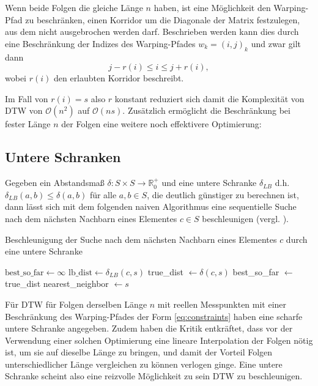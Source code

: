 Wenn beide Folgen die gleiche Länge $n$ haben, ist eine Möglichkeit den Warping-Pfad zu beschränken, einen Korridor um die Diagonale der Matrix festzulegen, aus dem nicht ausgebrochen werden darf. Beschrieben werden kann dies durch eine Beschränkung der Indizes des Warping-Pfades \( w_k = (i,j)_k \) und zwar gilt dann
\begin{equation}
  \label{eq:constraints}
  j - r(i) \leq i \leq j + r(i) ,
\end{equation}
wobei $r(i)$ den erlaubten Korridor beschreibt.

Im Fall von \(r(i) = s\) also $r$ konstant reduziert sich damit die Komplexität von DTW von \( \mathcal{O}(n^2) \) auf \( \mathcal{O}(ns) \). Zusätzlich ermöglicht die Beschränkung bei fester Länge $n$ der Folgen eine weitere noch effektivere Optimierung:

\subsection{Untere Schranken} %
\label{sub:lower_bounding}

Gegeben ein Abstandsmaß \( \delta : S\times S \rightarrow \mathbb{R}_0^+ \) und eine untere Schranke \( \delta_{LB} \) d.h. \( \delta_{LB}(a,b) \leq \delta(a,b) \) für alle \( a,b \in S \), die deutlich günstiger zu berechnen ist, dann lässt sich mit dem folgenden naiven Algorithmus eine sequentielle Suche nach dem nächsten Nachbarn eines Elementes \( c \in S \) beschleunigen (vergl. \cite{Keogh:2005p7751}).

\begin{algorithm}
  \caption{Beschleunigung der Suche nach dem nächsten Nachbarn eines Elementes \(c\) durch eine untere Schranke}
  \begin{algorithmic}
    \STATE $\text{best\_so\_far} \gets \infty$
      \STATE $\text{lb\_dist} \gets \delta_{LB}(c,s)$
        \STATE true\_dist $\gets \delta(c,s)$
          \STATE best\_so\_far $\gets$ true\_dist
          \STATE nearest\_neighbor $\gets s$
        \ENDIF
      \ENDIF
    \ENDFOR
  \end{algorithmic}
\end{algorithm}

Für DTW für Folgen derselben Länge $n$ mit reellen Messpunkten mit einer Beschränkung des Warping-Pfades der Form \ref{eq:constraints} haben \citet{Keogh:2005p7751} eine scharfe untere Schranke angegeben. Zudem haben \citet{Ratanamahatana:2004p7522} die Kritik entkräftet, dass vor der Verwendung einer solchen Optimierung eine lineare Interpolation der Folgen nötig ist, um sie auf dieselbe Länge zu bringen, und damit der Vorteil Folgen unterschiedlicher Länge vergleichen zu können verlogen ginge. Eine untere Schranke scheint also eine reizvolle Möglichkeit zu sein DTW zu beschleunigen.


